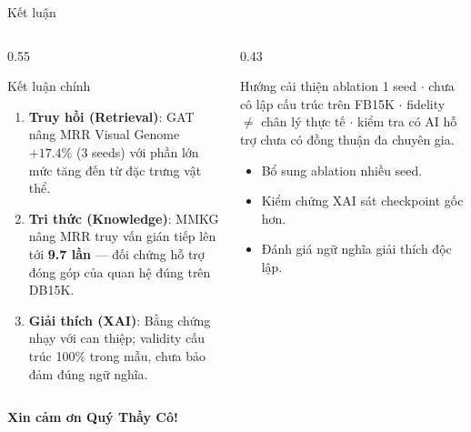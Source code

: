 \documentclass[aspectratio=169,10pt]{beamer}
\begin{document}
\begin{frame}{Kết luận}
  \begin{columns}[t]
    \begin{column}{0.55\textwidth}
      \begin{block}{Kết luận chính}\footnotesize
        \begin{enumerate}
          \item \textbf{Truy hồi (Retrieval)}: GAT nâng MRR Visual Genome $+17.4\%$ (3 seeds) với phần lớn mức tăng đến từ đặc trưng vật thể.
          \item \textbf{Tri thức (Knowledge)}: MMKG nâng MRR truy vấn gián tiếp lên tới \textbf{9.7 lần} --- đối chứng hỗ trợ đóng góp của quan hệ đúng trên DB15K.
          \item \textbf{Giải thích (XAI)}: Bằng chứng nhạy với can thiệp; validity cấu trúc 100\% trong mẫu, chưa bảo đảm đúng ngữ nghĩa.
        \end{enumerate}
      \end{block}
      \vspace{0.04cm}

    \end{column}
    \begin{column}{0.43\textwidth}
      \begin{block}{Hướng cải thiện}\scriptsize
        ablation 1 seed $\cdot$ chưa cô lập cấu trúc trên FB15K $\cdot$ fidelity $\ne$ chân lý thực tế $\cdot$ kiểm tra có AI hỗ trợ chưa có đồng thuận đa chuyên gia.
      \end{block}
      \begin{itemize}\footnotesize
        \item Bổ sung ablation nhiều seed.
        \item Kiểm chứng XAI sát checkpoint gốc hơn.
        \item Đánh giá ngữ nghĩa giải thích độc lập.
      \end{itemize}
    \end{column}
  \end{columns}
  \vspace{0.25cm}
  \begin{center}
    {\normalsize\bfseries\color{HCMUSBlue} Xin cảm ơn Quý Thầy Cô!}
  \end{center}
\end{frame}
\end{document}
